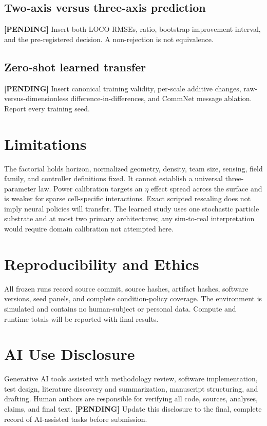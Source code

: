 \documentclass{article}
\newcommand{\etaT}{\eta}
\newcommand{\pending}[1]{\textcolor{red!70!black}{\textbf{[PENDING]} #1}}
\begin{document}
\subsection{Two-axis versus three-axis prediction}
\pending{Insert both LOCO RMSEs, ratio, bootstrap improvement interval, and the
pre-registered decision. A non-rejection is not equivalence.}

\subsection{Zero-shot learned transfer}
\pending{Insert canonical training validity, per-scale additive changes,
raw-versus-dimensionless difference-in-differences, and CommNet message
ablation. Report every training seed.}

\section{Limitations}

The factorial holds horizon, normalized geometry, density, team size, sensing,
field family, and controller definitions fixed. It cannot establish a universal
three-parameter law. Power calibration targets an $\etaT$ effect spread across
the surface and is weaker for sparse cell-specific interactions. Exact scripted
rescaling does not imply neural policies will transfer. The learned study uses
one stochastic particle substrate and at most two primary architectures; any
sim-to-real interpretation would require domain calibration not attempted here.

\section{Reproducibility and Ethics}

All frozen runs record source commit, source hashes, artifact hashes, software
versions, seed panels, and complete condition-policy coverage. The environment
is simulated and contains no human-subject or personal data. Compute and
runtime totals will be reported with final results.

\section*{AI Use Disclosure}

Generative AI tools assisted with methodology review, software implementation,
test design, literature discovery and summarization, manuscript structuring,
and drafting. Human authors are responsible for verifying all code, sources,
analyses, claims, and final text. \pending{Update this disclosure to the final,
complete record of AI-assisted tasks before submission.}
\end{document}
